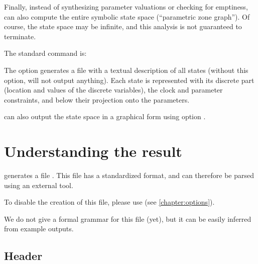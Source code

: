 Finally, instead of synthesizing parameter valuations or checking for emptiness,
\imitator{} can also compute the entire symbolic state space (``parametric zone graph'').
Of course, the state space may be infinite, and this analysis is not guaranteed to terminate.

The standard command is:


The option  generates a file with a textual description of all states (without this option, \imitator{} will not output anything).
Each state is represented with its discrete part (location and values of the discrete variables), the clock and parameter constraints, and below their projection onto the parameters.

\imitator{} can also output the state space in a graphical form using option .


\chapter{Understanding the \imitator{} result}\label{chapter:result}

\imitator{} generates a file .
This file has a standardized format, and can therefore be parsed using an external tool.

To disable the creation of this file, please use 
(see \cref{chapter:options}).

We do not give a formal grammar for this file (yet), but it can be easily inferred from example outputs.


\section{Header}

